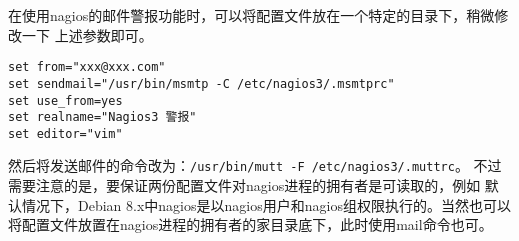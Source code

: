 在使用nagios的邮件警报功能时，可以将配置文件放在一个特定的目录下，稍微修改一下%
上述参数即可。

\begin{Verbatim}[]
set from="xxx@xxx.com"
set sendmail="/usr/bin/msmtp -C /etc/nagios3/.msmtprc"
set use_from=yes
set realname="Nagios3 警报"
set editor="vim"
\end{Verbatim}

然后将发送邮件的命令改为：\verb"/usr/bin/mutt -F /etc/nagios3/.muttrc"。%
不过需要注意的是，要保证两份配置文件对nagios进程的拥有者是可读取的，例如%
默认情况下，Debian 8.x中nagios是以nagios用户和nagios组权限执行的。当然也可以%
将配置文件放置在nagios进程的拥有者的家目录底下，此时使用mail命令也可。
